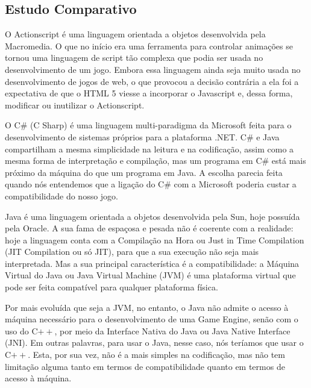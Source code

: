 \subsection{Estudo Comparativo}
%
O Actionscript é uma linguagem orientada a objetos desenvolvida pela Macromedia. O que no início era uma ferramenta para controlar animações 
se tornou uma linguagem de script tão complexa que podia ser usada no desenvolvimento de um jogo. Embora essa linguagem ainda seja muito usada 
no desenvolvimento de jogos de web, o que provocou a decisão contrária a ela foi a expectativa de que o HTML 5 viesse a incorporar o Javascript e, 
dessa forma, modificar ou inutilizar o Actionscript.
\par
O C\# (C Sharp) é uma linguagem multi-paradigma da Microsoft feita para o desenvolvimento de sistemas próprios para a plataforma .NET. C\# e Java 
compartilham a mesma simplicidade na leitura e na codificação, assim como a mesma forma de interpretação e compilação, mas um programa em C\# está 
mais próximo da máquina do que um programa em Java. A escolha parecia feita quando nós entendemos que a ligação do C\# com a Microsoft poderia 
custar a compatibilidade do nosso jogo.
\par
Java é uma linguagem orientada a objetos desenvolvida pela Sun, hoje possuída pela Oracle. A sua fama de espaçosa e pesada não é coerente com a 
realidade: hoje a linguagem conta com a Compilação na Hora ou Just in Time Compilation (JIT Compilation ou só JIT), 
para que a sua execução não seja mais interpretada. Mas a sua principal característica é a compatibilidade: a Máquina Virtual do Java ou Java Virtual Machine (JVM) é uma plataforma virtual que pode ser feita compatível para qualquer plataforma física.
\par
Por mais evoluída que seja a JVM, no entanto, o Java não admite o acesso à máquina necessário para o desenvolvimento de uma Game Engine, 
senão com o uso do C$++$, por meio da Interface Nativa do Java ou Java Native Interface (JNI). Em outras palavras, para usar o Java, nesse caso, 
nós teríamos que usar o C$++$. Esta, por sua vez, não é a mais simples na codificação, mas não tem limitação alguma tanto em termos de 
compatibilidade quanto em termos de acesso à máquina.
%
